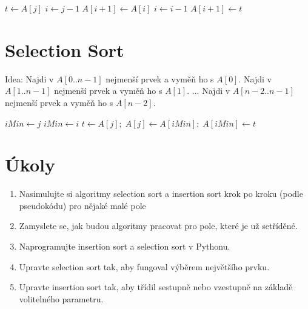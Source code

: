 \documentclass[openany,12pt,a4paper]{book}
\begin{document}
\begin{algorithm}[h!]
\caption{Insertion-Sort(\(A[0..n-1]\))}
\begin{algorithmic}[1]
  \State $t \gets A[j]$
  \State $i \gets j - 1$
    \State $A[i + 1] \gets A[i]$
    \State $i \gets i - 1$
  \EndWhile
  \State $A[i + 1] \gets t$
\EndFor
\end{algorithmic}
\end{algorithm}

\section{Selection Sort}

Idea: Najdi v \( A[0..n-1] \) nejmenší prvek a vyměň ho s \( A[0] \).  
Najdi v \( A[1..n-1] \) nejmenší prvek a vyměň ho s \( A[1] \).  
\(\ldots\)  
Najdi v \( A[n-2..n-1] \) nejmenší prvek a vyměň ho s \( A[n-2] \).

\begin{algorithm}[h!]
\caption{Selection-Sort(\(A[0..n-1]\))}
\begin{algorithmic}[1]
  \State $iMin \gets j$
      \State $iMin \gets i$
    \EndIf
  \EndFor
  \State $t \gets A[j]; \; A[j] \gets A[iMin]; \; A[iMin] \gets t$
\EndFor
\end{algorithmic}
\end{algorithm}


\section{Úkoly}
	\begin{enumerate}
		\item Nasimulujte si algoritmy selection sort a insertion sort krok po kroku (podle pseudokódu) pro nějaké malé pole 
		\item Zamyslete se, jak budou algoritmy pracovat pro pole, které je už setříděné.
		\item Naprogramujte insertion sort a selection sort v Pythonu.
		\item Upravte selection sort tak, aby fungoval výběrem největšího prvku.
		\item Upravte insertion sort tak, aby třídil sestupně nebo vzestupně na základě volitelného parametru.
	\end{enumerate}
\end{document}
